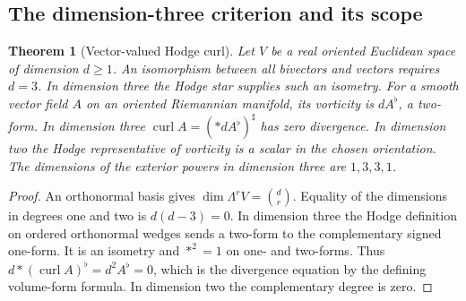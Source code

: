 \documentclass[11pt,reqno]{amsart}
\newtheorem{theorem}{Theorem}[section]
\theoremstyle{definition}
\theoremstyle{remark}
\numberwithin{equation}{section}
\begin{document}
\subsection{The dimension-three criterion and its scope}

\begin{theorem}[Vector-valued Hodge curl]\label{m10:curl}
Let \(V\) be a real oriented Euclidean space of dimension \(d\ge1\).
An isomorphism between all bivectors and vectors requires \(d=3\).
In dimension three the Hodge star supplies such an isometry.
For a smooth vector field \(A\) on an oriented Riemannian manifold,
its vorticity is \(dA^\flat\), a two-form. In dimension three
\(\operatorname{curl} A=(*dA^\flat)^\sharp\) has zero divergence.
In dimension two the Hodge representative of vorticity is a
scalar in the chosen orientation. The dimensions of the
exterior powers in dimension three are \(1,3,3,1\).
\end{theorem}

\begin{proof}
An orthonormal basis gives
\(\dim\Lambda^r V=\binom dr\). Equality of the dimensions in
degrees one and two is \(d(d-3)=0\). In dimension three the
Hodge definition on ordered orthonormal wedges sends a two-form
to the complementary signed one-form. It is an isometry and
\(*^2=1\) on one- and two-forms. Thus
\(d*(\operatorname{curl} A)^\flat=d^2A^\flat=0\), which is
the divergence equation by the defining volume-form formula.
In dimension two the complementary degree is zero.
\end{proof}
\end{document}
